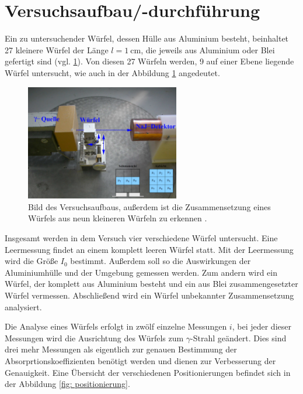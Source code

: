 \section{Versuchsaufbau/-durchführung}
Ein zu untersuchender Würfel, dessen Hülle aus Aluminium besteht, beinhaltet 27 kleinere Würfel der Länge $l=\SI{1}{\centi\meter}$,
die jeweils aus Aluminium oder Blei gefertigt sind (vgl. \ref{fig: aufbau}).
Von diesen 27 Würfeln werden, 9 auf einer Ebene liegende Würfel untersucht, wie auch in der Abbildung \ref{fig: aufbau} angedeutet.

\begin{figure}[h]
  \centering
  \includegraphics[width=0.6\textwidth]{pics/Aufbau.pdf}
  \caption{Bild des Versuchsaufbaus, außerdem ist die Zusammensetzung eines Würfels aus neun kleineren Würfeln zu erkennen \cite{anleitungb14}.}
  \label{fig: aufbau}
\end{figure}

Insgesamt werden in dem Versuch vier verschiedene Würfel untersucht. Eine Leermessung findet an
einem komplett leeren Würfel statt. Mit der Leermessung wird die Größe $I_0$ bestimmt.
Außerdem soll so die Auswirkungen der Aluminiumhülle und der Umgebung gemessen werden.
Zum andern wird ein Würfel, der komplett aus Aluminium besteht und
ein aus Blei zusammengesetzter Würfel vermessen. Abschließend wird ein Würfel
unbekannter Zusammensetzung analysiert.

Die Analyse eines Würfels erfolgt in zwölf einzelne Messungen $i$,
bei jeder dieser Messungen wird die Ausrichtung des Würfels zum $\gamma$-Strahl geändert.
Dies sind drei mehr Messungen als eigentlich zur genauen Bestimmung der Absorprtionskoeffizienten
benötigt werden und dienen zur Verbesserung der Genauigkeit.
Eine Übersicht der verschiedenen Positionierungen befindet sich in der Abbildung \ref{fig: positionierung}.

